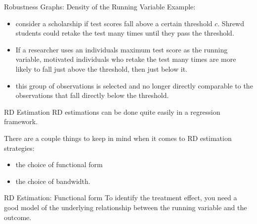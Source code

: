 \documentclass[
  ignorenonframetext,
]{beamer}
\begin{document}
\begin{frame}{Robustness Graphs: Density of the Running Variable}
\protect\hypertarget{robustness-graphs-density-of-the-running-variable-1}{}
Example:

\begin{itemize}
\item
  consider a scholarship if test scores fall above a certain threshold
  \(c\). Shrewd students could retake the test many times until they
  pass the threshold.
\item
  If a researcher uses an individuals maximum test score as the running
  variable, motivated individuals who retake the test many times are
  more likely to fall just above the threshold, then just below it.
\item
  this group of observations is selected and no longer directly
  comparable to the observations that fall directly below the threshold.
\end{itemize}
\end{frame}

\begin{frame}{RD Estimation}
\protect\hypertarget{rd-estimation}{}
RD estimations can be done quite easily in a regression framework.

There are a couple things to keep in mind when it comes to RD estimation
strategies:

\begin{itemize}
\item
  the choice of functional form
\item
  the choice of bandwidth.
\end{itemize}
\end{frame}

\begin{frame}{RD Estimation: Functional form}
\protect\hypertarget{rd-estimation-functional-form}{}
To identify the treatment effect, you need a good model of the
underlying relationship between the running variable and the outcome.
\end{frame}
\end{document}
